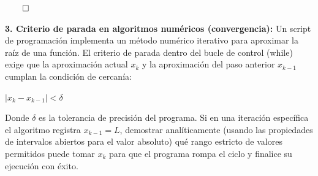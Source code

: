 \documentclass{article}
\begin{document}
$\qed$

\textbf{3. Criterio de parada en algoritmos numéricos (convergencia):} Un script de programación implementa un método numérico iterativo para aproximar la raíz de una función. El criterio de parada dentro del bucle de control (while) exige que la aproximación actual $x_k$ y la aproximación del paso anterior $x_{k - 1}$ cumplan la condición de cercanía:

$\mid x_k - x_{k - 1} \mid < \delta$

Donde $\delta$ es la tolerancia de precisión del programa. Si en una iteración específica el algoritmo registra $x_{k - 1} = L$, demostrar analíticamente (usando las propiedades de intervalos abiertos para el valor absoluto) qué rango estricto de valores permitidos puede tomar $x_k$ para que el programa rompa el ciclo y finalice su ejecución con éxito. 
\end{document}
